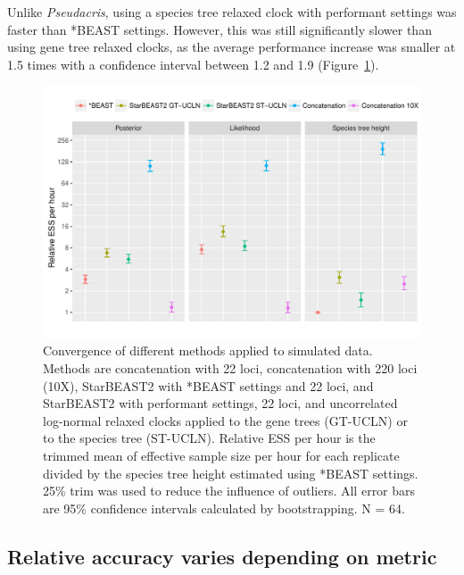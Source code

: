 \documentclass[12pt]{article}
\begin{document}
Unlike \textit{Pseudacris}, using a species tree relaxed clock with
performant settings was faster than *BEAST settings. However, this was still
significantly slower than using gene tree relaxed clocks, as the average
performance increase was smaller at 1.5 times with a confidence interval between
1.2 and 1.9 (Figure~\ref{fig:simulatedEssPerHour}).

\begin{figure}[htb!]
\centering
\includegraphics[width=16cm]{multiple_ess_per_hour.pdf}
\caption
{Convergence of different methods applied to simulated data. Methods are
concatenation with 22 loci, concatenation with 220 loci (10X), StarBEAST2 with
*BEAST settings and 22 loci, and StarBEAST2 with performant settings, 22 loci,
and uncorrelated log-normal relaxed clocks applied to the gene trees (GT-UCLN) or
to the species tree (ST-UCLN). Relative ESS per hour is the trimmed mean of
effective sample size per hour for each replicate divided by the species tree height estimated using *BEAST
settings. 25\% trim was used to reduce the influence of
outliers. All error bars are 95\% confidence intervals calculated by
bootstrapping. N = 64.}
\label{fig:simulatedEssPerHour}
\end{figure}

\subsection*{Relative accuracy varies depending on metric}
\end{document}
